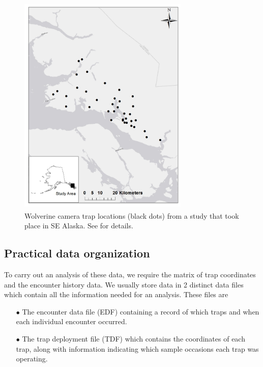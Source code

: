 \begin{figure}[ht]
\begin{center}
\includegraphics[height=4.22in,width=3.2in]{Ch5-SCR0/figs/Wolverines_cameratrap}
\end{center}
\caption{
Wolverine camera trap locations (black dots) from a study that took
place in SE Alaska. See
\citet{magoun_etal:2011} for details.
}
\label{scr0.fig.wolverinelocs}
\end{figure}


\subsection{Practical data organization}

To carry out an analysis of these data, we require the matrix of trap
coordinates and the encounter history data.  We usually store data in
2 distinct data files which contain all the information needed for an
analysis. These files are
\begin{itemize}
\item[$\bullet$] The encounter data file (EDF) containing a record of which
  traps and when each individual encounter occurred.
\item[$\bullet$] The trap deployment file (TDF) which contains the
  coordinates of each trap, along with information
 indicating which sample
  occasions each trap was operating.
\end{itemize}

